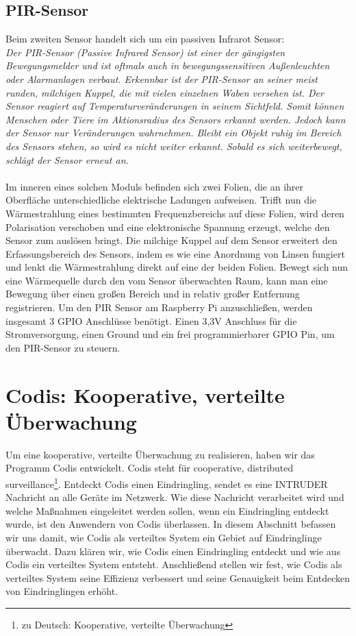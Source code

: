 \documentclass[journal]{IEEEtran}
\begin{document}
\subsection{PIR-Sensor}
Beim zweiten Sensor handelt sich um ein passiven Infrarot Sensor:\\ \textit{Der PIR-Sensor (Passive Infrared Sensor) ist einer der gängigsten Bewegungsmelder und ist oftmals auch in bewegungssensitiven Außenleuchten oder Alarmanlagen verbaut. Erkennbar ist der PIR-Sensor an seiner meist runden, milchigen Kuppel, die mit vielen einzelnen Waben versehen ist. Der Sensor reagiert auf Temperaturveränderungen in seinem Sichtfeld. Somit können Menschen oder Tiere im Aktionsradius des Sensors erkannt werden. Jedoch kann der Sensor nur Veränderungen wahrnehmen. Bleibt ein Objekt ruhig im Bereich des Sensors stehen, so wird es nicht weiter erkannt.  Sobald es sich weiterbewegt, schlägt der Sensor erneut an.}\cite[S. 493]{raspi}\\ \\ Im inneren eines solchen Moduls befinden sich zwei Folien, die an ihrer Oberfläche unterschiedliche elektrische Ladungen aufweisen. Trifft nun die Wärmestrahlung eines bestimmten Frequenzbereichs auf diese Folien, wird deren Polarisation verschoben und eine elektronische Spannung erzeugt, welche den Sensor zum auslösen bringt. Die milchige Kuppel auf dem Sensor erweitert den Erfassungsbereich des Sensors, indem es wie eine Anordnung von Linsen fungiert und lenkt die Wärmestrahlung direkt auf eine der beiden Folien. Bewegt sich nun eine Wärmequelle durch den vom Sensor überwachten Raum, kann man eine Bewegung über einen großen Bereich und in relativ großer Entfernung registrieren.\cite{pir} Um den PIR Sensor am Raspberry Pi anzuschließen, werden insgesamt 3 GPIO Anschlüsse benötigt. Einen 3,3V Anschluss für die Stromversorgung, einen Ground und ein frei programmierbarer GPIO Pin, um den PIR-Sensor zu steuern.


\section{Codis: Kooperative, verteilte Überwachung}

Um eine kooperative, verteilte Überwachung zu realisieren, haben wir das Programm Codis entwickelt. Codis steht für cooperative, distributed surveillance\footnote{zu Deutsch: Kooperative, verteilte Überwachung}. Entdeckt Codis einen Eindringling, sendet es eine \MakeUppercase{intruder} Nachricht an alle Geräte im Netzwerk. Wie diese Nachricht verarbeitet wird und welche Maßnahmen eingeleitet werden sollen, wenn ein Eindringling entdeckt wurde, ist den Anwendern von Codis überlassen. In diesem Abschnitt befassen wir uns damit, wie Codis als verteiltes System ein Gebiet auf Eindringlinge überwacht. Dazu klären wir, wie Codis einen Eindringling entdeckt und wie aus Codis ein verteiltes System entsteht. Anschließend stellen wir fest, wie Codis als verteiltes System seine Effizienz verbessert und seine Genauigkeit beim Entdecken von Eindringlingen erhöht.
\end{document}

